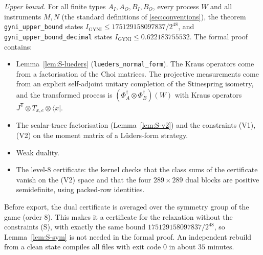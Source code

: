 \documentclass[aps,pra,onecolumn,notitlepage,superscriptaddress,longbibliography,nofootinbib,11pt]{revtex4-2}
\theoremstyle{remark}
\newcommand{\tp}{\mathsf{T}}
\newcommand{\Igy}{I_{\mathrm{GYNI}}}
\begin{document}
\emph{Upper bound.} For all finite types $A_I,A_O,B_I,B_O$, every process $W$ and all instruments $M,N$ (the standard definitions of \ref{sec:conventions}), the theorem \texttt{gyni\_upper\_bound} states $\Igy\le175129158097837/2^{48}$, and \texttt{gyni\_upper\_bound\_decimal} states $\Igy\le0.622183755532$. The formal proof contains:
\begin{itemize}
\item Lemma~\ref{lem:S-lueders} (\texttt{lueders\_normal\_form}). The Kraus operators come from a factorisation of the Choi matrices. The projective measurements come from an explicit self-adjoint unitary completion of the Stinespring isometry, and the transformed process is $(\Phi_A^\dagger\otimes\Phi_B^\dagger)(W)$ with Kraus operators $J^{\tp}\otimes T_{x,e}\otimes\langle x|$.
\item The scalar-trace factorisation (Lemma~\ref{lem:S-v2}) and the constraints (V1), (V2) on the moment matrix of a L\"uders-form strategy.
\item Weak duality.
\item The level-8 certificate: the kernel checks that the class sums of the certificate vanish on the (V2) space and that the four $289\times289$ dual blocks are positive semidefinite, using packed-row identities.
\end{itemize}
Before export, the dual certificate is averaged over the symmetry group of the game (order 8). This makes it a certificate for the relaxation without the constraints (S), with exactly the same bound $175129158097837/2^{48}$, so Lemma~\ref{lem:S-sym} is not needed in the formal proof. An independent rebuild from a clean state compiles all files with exit code 0 in about $35$ minutes.
\end{document}
